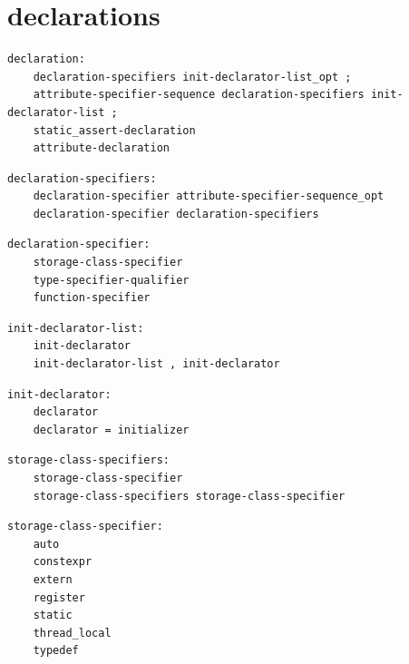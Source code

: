 \section{declarations}

\noindent\textbf{\texttt{}}\par
\begin{lstlisting}
declaration:
    declaration-specifiers init-declarator-list_opt ;
    attribute-specifier-sequence declaration-specifiers init-declarator-list ;
    static_assert-declaration
    attribute-declaration
\end{lstlisting}

\noindent\textbf{\texttt{}}\par
\begin{lstlisting}
declaration-specifiers:
    declaration-specifier attribute-specifier-sequence_opt
    declaration-specifier declaration-specifiers
\end{lstlisting}

\noindent\textbf{\texttt{}}\par
\begin{lstlisting}
declaration-specifier:
    storage-class-specifier
    type-specifier-qualifier
    function-specifier
\end{lstlisting}

\noindent\textbf{\texttt{}}\par
\begin{lstlisting}
init-declarator-list:
    init-declarator
    init-declarator-list , init-declarator
\end{lstlisting}

\noindent\textbf{\texttt{}}\par
\begin{lstlisting}
init-declarator:
    declarator
    declarator = initializer
\end{lstlisting}

\noindent\textbf{\texttt{}}\par
\begin{lstlisting}
storage-class-specifiers:
    storage-class-specifier
    storage-class-specifiers storage-class-specifier
\end{lstlisting}

\noindent\textbf{\texttt{}}\par
\begin{lstlisting}
storage-class-specifier:
    auto
    constexpr
    extern
    register
    static
    thread_local
    typedef
\end{lstlisting}

